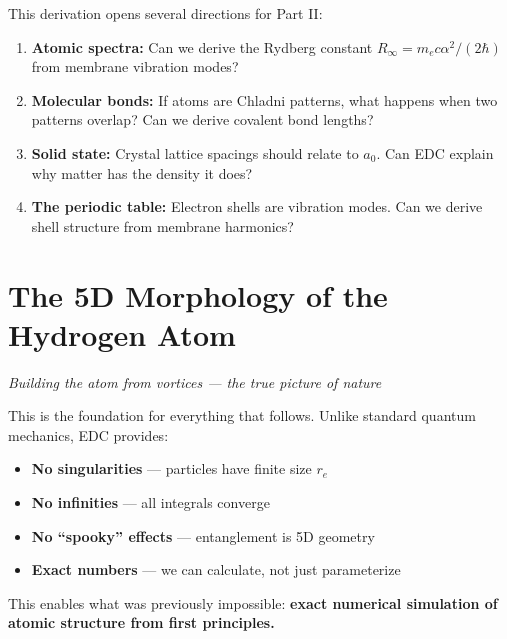 This derivation opens several directions for Part II:

\begin{enumerate}
    \item \textbf{Atomic spectra:} Can we derive the Rydberg constant $R_\infty = m_e c \alpha^2 / (2\hbar)$ from membrane vibration modes?
    
    \item \textbf{Molecular bonds:} If atoms are Chladni patterns, what happens when two patterns overlap? Can we derive covalent bond lengths?
    
    \item \textbf{Solid state:} Crystal lattice spacings should relate to $a_0$. Can EDC explain why matter has the density it does?
    
    \item \textbf{The periodic table:} Electron shells are vibration modes. Can we derive shell structure from membrane harmonics?
\end{enumerate}

\newpage


\section{The 5D Morphology of the Hydrogen Atom}
\label{sec:hydrogen_5d}

\begin{center}
\textit{Building the atom from vortices --- the true picture of nature}
\end{center}

\vspace{1em}

\begin{tcolorbox}[colback=red!5,colframe=red!70!black,title=\textbf{Why This Section Matters}]
This is the foundation for everything that follows. Unlike standard quantum mechanics, EDC provides:

\begin{itemize}
    \item \textbf{No singularities} --- particles have finite size $r_e$
    \item \textbf{No infinities} --- all integrals converge
    \item \textbf{No ``spooky'' effects} --- entanglement is 5D geometry
    \item \textbf{Exact numbers} --- we can calculate, not just parameterize
\end{itemize}

This enables what was previously impossible: \textbf{exact numerical simulation of atomic structure from first principles.}
\end{tcolorbox}

